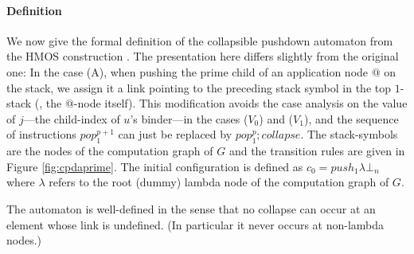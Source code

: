 \documentclass[a4paper,draft]{article}[12pt]
\theoremstyle{remark}
\theoremstyle{definition}
\begin{document}
\paragraph{Definition}
We now give the formal definition of the collapsible pushdown automaton from the HMOS construction
\cite{hmos-lics08}. The presentation here differs slightly from the original one: In the case (A), when pushing the prime child of an application node $@$ on the stack, we assign it a link pointing to the preceding stack symbol in the top $1$-stack (\ie, the $@$-node itself).
 This modification avoids the case analysis on the value of $j$---the child-index of $u$'s binder---in the
 cases ($V_0$) and ($V_1$), and the sequence of instructions $pop_1^{p+1}$ can just be replaced by
 $pop_1^p ; collapse$. The stack-symbols are the nodes of the computation graph of $G$ and the transition rules are given in
Figure \ref{fig:cpdaprime}. The initial configuration is defined as $c_0 = push_1 \lambda \bot_n$
where $\lambda$ refers to the root (dummy) lambda node of the computation graph of $G$.

The automaton is well-defined in the sense that no collapse can occur at an element whose link is undefined.
(In particular it never occurs at non-lambda nodes.)

\begin{figure}
\begin{center}
\end{center}
\end{figure}
\end{document}
